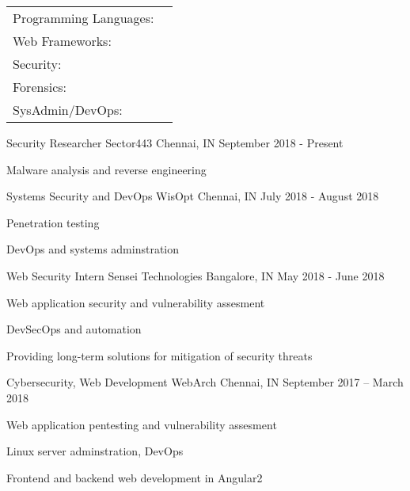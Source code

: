 \documentclass[]{awesome-cv}
\begin{document}
\begin{cventries}
	\cventry
	{}
	{\def\arraystretch{1.15}{\begin{tabular}{ l l }
		Programming Languages:  & {\skill{ Python, Shell, Nim, C, JS, PHP, HTML/CSS}} \\
		Web Frameworks:  & {\skill{ Flask, Angular2, Hugo, Bootstrap, Materialize/MDL}} \\
		Security: & {\skill{ Vulnerability Assessment, Web Security, Penetration Testing, Networking}} \\
		Forensics: & {\skill{Filesystems, The Sleuth Kit, Volatility}} \\
		SysAdmin/DevOps:  & {\skill{ Unix tools/CLI, AWS, Digital Ocean, Git, TravisCI}} \\
		\end{tabular}}}
	{}
	{}
	{}
\end{cventries}


\vspace{-10mm}
\vspace{-3mm}
\begin{cventries}
	\cventry
	{Security Researcher}
	{Sector443}
	{Chennai, IN}
	{September 2018 - Present}
	{\begin{cvitems}
		\item {Malware analysis and reverse engineering}
	\end{cvitems}}
	\cventry
	{Systems Security and DevOps}
	{WisOpt}
	{Chennai, IN}
	{July 2018 - August 2018}
	{\begin{cvitems}
		\item {Penetration testing}
		\item {DevOps and systems adminstration}
	\end{cvitems}}
	\cventry
	{Web Security Intern}
	{Sensei Technologies}
	{Bangalore, IN}
	{May 2018 - June 2018}
	{\begin{cvitems}
		\item {Web application security and vulnerability assesment}
		\item {DevSecOps and automation}
		\item {Providing long-term solutions for mitigation of security threats}
	\end{cvitems}}
	\cventry
	{Cybersecurity, Web Development}
	{WebArch}
	{Chennai, IN}
	{September 2017 – March 2018}
	{\begin{cvitems}
		\item {Web application pentesting and vulnerability assesment}
		\item {Linux server adminstration, DevOps}
		\item {Frontend and backend web development in Angular2}
	\end{cvitems}}
\end{cventries}
\end{document}
